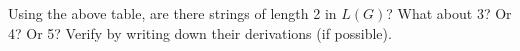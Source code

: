 Using the above table, are there strings of length 2 in $L(G)$?
What about 3? Or 4? Or 5?
Verify by writing down their derivations (if possible).
